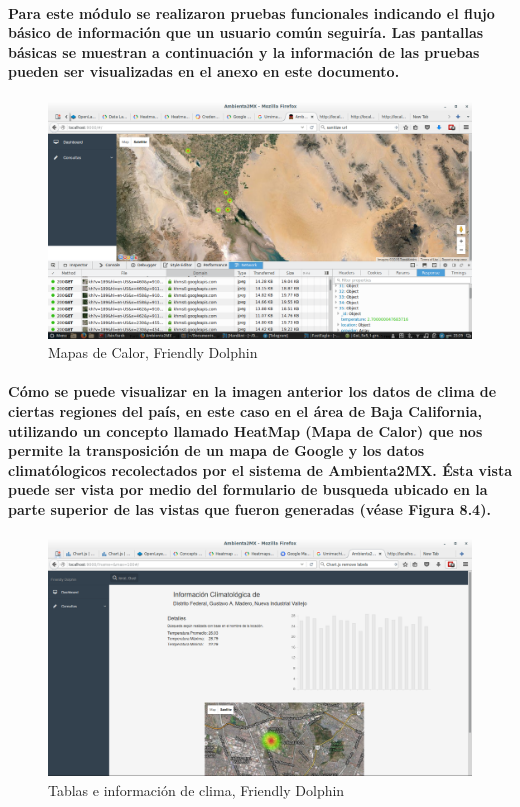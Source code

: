     \paragraph{Para este módulo se realizaron pruebas funcionales indicando el flujo básico de información que un usuario común seguiría. Las pantallas básicas se muestran a continuación y la información de las pruebas pueden ser visualizadas en el anexo en este documento.}
    \begin{figure}[b!]
      \centering
        \includegraphics[width=\textwidth]{./images/CapturaFriendlyDolphin}
      \caption{Mapas de Calor, Friendly Dolphin}
    \end{figure}
    \paragraph{Cómo se puede visualizar en la imagen anterior los datos de clima de ciertas regiones del país, en este caso en el área de Baja California, utilizando un concepto llamado HeatMap (Mapa de Calor) que nos permite la transposición de un mapa de Google y los datos climatólogicos recolectados por el sistema de Ambienta2MX. Ésta vista puede ser vista por medio del formulario de busqueda ubicado en la parte superior de las vistas que fueron generadas (véase Figura 8.4).}
    \begin{figure}[b!]
      \centering
        \includegraphics[width=\textwidth]{./images/CapturaFriendlyDolphin2}
      \caption{Tablas e información de clima, Friendly Dolphin}
    \end{figure}

